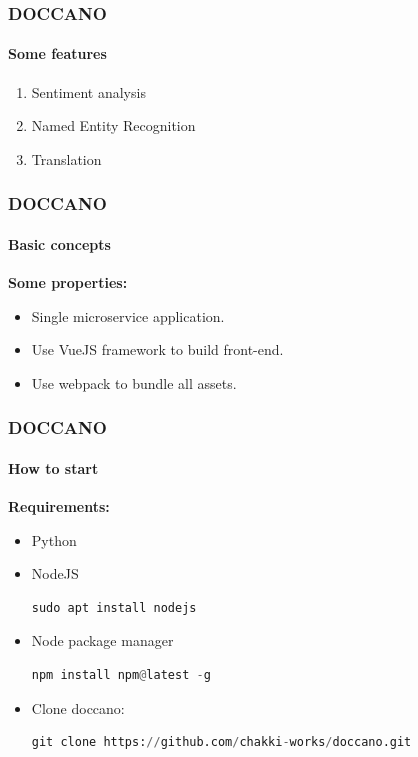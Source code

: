 \documentclass[10pt]{beamer}
\begin{document}
\begin{frame}[fragile]
    \frametitle{\textbf{DOCCANO}}
    \framesubtitle{\textbf{Some features}}
    \begin{enumerate}
        \item Sentiment analysis
        \item Named Entity Recognition
        \item Translation
    \end{enumerate}
\end{frame}
\begin{frame}
    \frametitle{\textbf{DOCCANO}}
    \framesubtitle{\textbf{Basic concepts}}
    \large{\textbf{Some properties:}}
    \begin{itemize}
        \item Single microservice application.
        \item Use VueJS framework to build front-end.
        \item Use webpack to bundle all assets.
    \end{itemize}
\end{frame}
\begin{frame}[fragile]
    \frametitle{\textbf{DOCCANO}}
    \framesubtitle{\textbf{How to start}}
    \large{\textbf{Requirements:}}
    \begin{itemize}
        \item Python
        \item NodeJS
        \begin{lstlisting}[language=Python]
    sudo apt install nodejs
        \end{lstlisting}
        \item Node package manager
        \begin{lstlisting}[language=Python]
    npm install npm@latest -g
        \end{lstlisting}
        \item Clone doccano: 
        \begin{lstlisting}[language=Python]
    git clone https://github.com/chakki-works/doccano.git
        \end{lstlisting}
    \end{itemize}
\end{frame}
\end{document}
